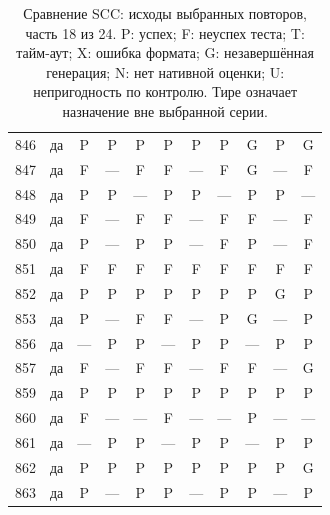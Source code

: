 \begin{table}[p]
\begin{tabular*}{\textwidth}{@{\extracolsep{\fill}}rc*{9}{c}@{}}
846 & да & P & P & P & P & P & P & G & P & G\\
847 & да & F & — & F & F & — & F & G & — & F\\
848 & да & P & P & — & P & P & — & P & P & —\\
849 & да & F & — & F & F & — & F & F & — & F\\
850 & да & P & — & P & P & — & F & P & — & F\\
851 & да & F & F & F & F & F & F & F & F & F\\
852 & да & P & P & P & P & P & P & P & G & P\\
853 & да & P & — & F & F & — & P & G & — & P\\
856 & да & — & P & P & — & P & P & — & P & P\\
857 & да & F & — & F & F & — & F & F & — & G\\
859 & да & P & P & P & P & P & P & P & P & P\\
860 & да & F & — & — & F & — & — & P & — & —\\
861 & да & — & P & P & — & P & P & — & P & P\\
862 & да & P & P & P & P & P & P & P & P & G\\
863 & да & P & — & P & P & — & P & P & — & P\\
\bottomrule\end{tabular*}
\caption{Сравнение SCC: исходы выбранных повторов, часть 18 из 24. P: успех; F: неуспех теста; T: тайм-аут; X: ошибка формата; G: незавершённая генерация; N: нет нативной оценки; U: непригодность по контролю. Тире означает назначение вне выбранной серии.}
\end{table}
\clearpage
